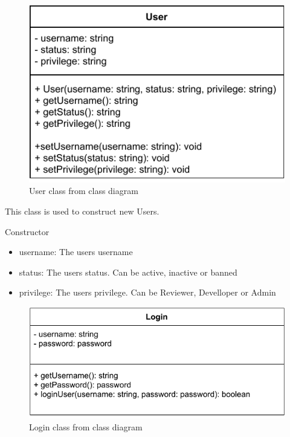 
\begin{figure}[H]
\centerline{\includegraphics[scale=1]{res/Klassen/UserClass.pdf}}
\caption{User class from class diagram}
\end{figure}

This class is used to construct new Users.
\begin{methodenv}{Constructor}



\begin{itemize}
	\item{username:}
	The users username
	\item{status:}
	The users status. Can be active, inactive or banned
	\item{privilege:}
	The users privilege. Can be Reviewer, Develloper or Admin
\end{itemize}
\end{methodenv}




\begin{figure}[H]
\centerline{\includegraphics[scale=1]{res/Klassen/LoginClass.pdf}}
\caption{Login class from class diagram}
\end{figure}

